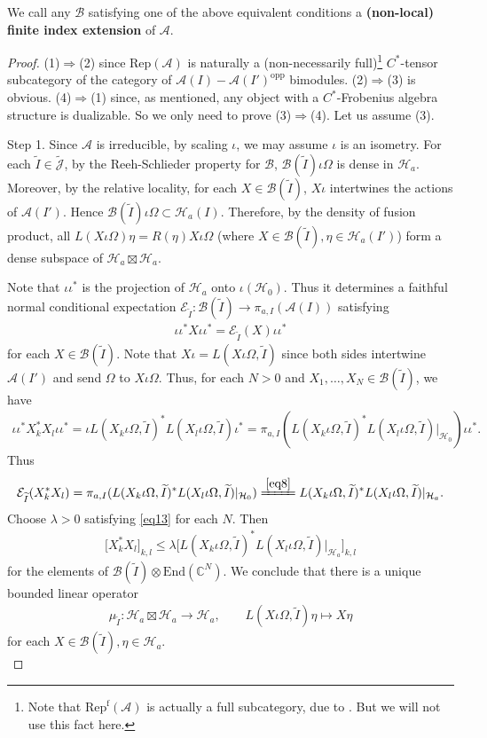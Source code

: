 \documentclass[11pt,b5paper,notitlepage]{article}
\theoremstyle{definition}
\theoremstyle{plain}
\newcommand{\mc}{\mathcal}
\newcommand{\wtd}{\widetilde}
\newcommand{\End}{\mathrm{End}} %
\newcommand{\opp}{\mathrm{opp}}
\newcommand{\Jtd}{\widetilde{\mathcal J}}
\newcommand{\RepA}{\mathrm{Rep}(\mathcal A)}
\newcommand{\RepfA}{\mathrm{Rep}^{\mathrm f}(\mathcal A)}
\newcommand{\Cbb}{\mathbb C}
\numberwithin{equation}{section}
\begin{document}
We call any $\mc B$ satisfying one of the above equivalent conditions a \textbf{(non-local) finite index extension} of $\mc A$.

\begin{proof}
(1)$\Rightarrow$(2) since $\RepA$ is naturally a (non-necessarily full)\footnote{Note that $\RepfA$ is actually a full subcategory, due to \cite[Thm. 2.3]{GL96}. But we will not use this fact here.}  $C^*$-tensor subcategory of the category of $\mc A(I)-\mc A(I')^\opp$ bimodules. (2)$\Rightarrow$(3) is obvious. (4)$\Rightarrow$(1) since, as mentioned, any object with a $C^*$-Frobenius algebra structure is dualizable. So we only need to prove (3)$\Rightarrow$(4). Let us assume (3).

Step 1. Since $\mc A$ is irreducible, by scaling $\iota$, we may assume $\iota$ is an isometry. For each $\wtd I\in\Jtd$, by the Reeh-Schlieder property for $\mc B$,  $\mc B(\wtd I)\iota\Omega$ is dense in $\mc H_a$. Moreover, by the relative locality, for each $X\in\mc B(\wtd I)$,  $X\iota$ intertwines the actions of $\mc A(I')$. Hence $\mc B(\wtd I)\iota\Omega\subset\mc H_a(I)$.   Therefore, by the density of fusion product, all $L(X\iota\Omega)\eta=R(\eta)X\iota\Omega$ (where $X\in\mc B(\wtd I),\eta\in\mc H_a(I')$) form a dense subspace of $\mc H_a\boxtimes\mc H_a$. 

Note that $\iota\iota^*$ is the projection of $\mc H_a$ onto $\iota(\mc H_0)$. Thus it determines a faithful normal conditional expectation $\mc E_{\wtd I}:\mc B(\wtd I)\rightarrow\pi_{a,I}(\mc A(I))$ satisfying 
\begin{align*}
\iota\iota^* X\iota\iota^*=\mc E_{\wtd I}(X)\iota\iota^*	
\end{align*}
for each $X\in\mc B(\wtd I)$. Note that $X\iota=L(X\iota\Omega,\wtd I)$ since both sides intertwine $\mc A(I')$ and send $\Omega$ to $X\iota\Omega$. Thus, for each $N>0$ and $X_1,\dots,X_N\in\mc B(\wtd I)$, we have
\begin{align*}
\iota\iota^* X_k^*X_l\iota\iota^*=\iota L(X_k\iota\Omega,\wtd I)^* L(X_l\iota\Omega,\wtd I)\iota^*=\pi_{a,I}(L(X_k\iota\Omega,\wtd I)^* L(X_l\iota\Omega,\wtd I)|_{\mc H_0})\iota\iota^*.
\end{align*}
Thus
\begin{align}
\mc E_{\wtd I}(X_k^*X_l)=\pi_{a,I}(L(X_k\iota\Omega,\wtd I)^* L(X_l\iota\Omega,\wtd I)|_{\mc H_0})\xlongequal{\eqref{eq8}}L(X_k\iota\Omega,\wtd I)^* L(X_l\iota\Omega,\wtd I)|_{\mc H_a}.	
\end{align}
Choose $\lambda>0$ satisfying \eqref{eq13} for each $N$. Then
\begin{align}
\big[X_k^*X_l\big]_{k,l}\leq \lambda \big[L(X_k\iota\Omega,\wtd I)^* L(X_l\iota\Omega,\wtd I)\big|_{\mc H_a}\big]_{k,l}	
\end{align}
for the elements of $\mc B(\wtd I)\otimes\End(\Cbb^N)$. We conclude that there is a unique bounded linear operator 
\begin{align}
\mu_{\wtd I}:\mc H_a\boxtimes\mc H_a\rightarrow\mc H_a,\qquad 	L(X\iota\Omega,\wtd I)\eta\mapsto X\eta\label{eq15}
\end{align}
for each $X\in\mc B(\wtd I),\eta\in\mc H_a$. \\


\end{proof}
\end{document}
